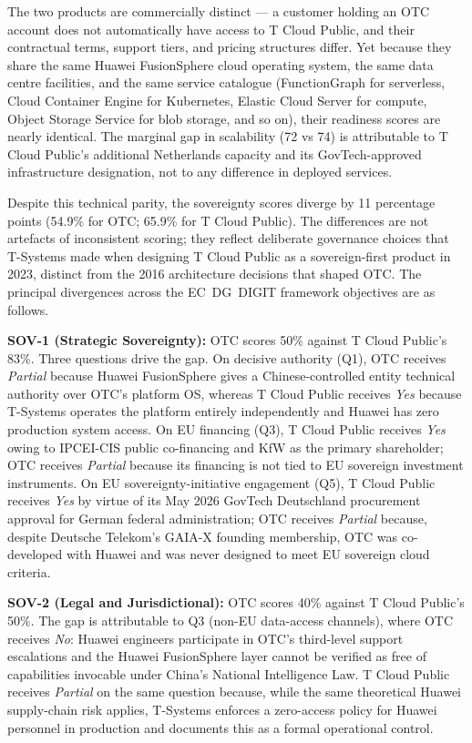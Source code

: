 The two products are commercially distinct — a customer holding an OTC account does not automatically have access to T Cloud Public, and their contractual terms, support tiers, and pricing structures differ. Yet because they share the same Huawei FusionSphere cloud operating system, the same data centre facilities, and the same service catalogue (FunctionGraph for serverless, Cloud Container Engine for Kubernetes, Elastic Cloud Server for compute, Object Storage Service for blob storage, and so on), their readiness scores are nearly identical. The marginal gap in scalability (72 vs 74) is attributable to T Cloud Public's additional Netherlands capacity and its GovTech-approved infrastructure designation, not to any difference in deployed services.

Despite this technical parity, the sovereignty scores diverge by 11 percentage points (54.9\% for OTC; 65.9\% for T Cloud Public). The differences are not artefacts of inconsistent scoring; they reflect deliberate governance choices that T-Systems made when designing T Cloud Public as a sovereign-first product in 2023, distinct from the 2016 architecture decisions that shaped OTC. The principal divergences across the EC~DG~DIGIT framework objectives are as follows.

\textbf{SOV-1 (Strategic Sovereignty):} OTC scores 50\% against T Cloud Public's 83\%. Three questions drive the gap. On decisive authority (Q1), OTC receives \textit{Partial} because Huawei FusionSphere gives a Chinese-controlled entity technical authority over OTC's platform OS, whereas T Cloud Public receives \textit{Yes} because T-Systems operates the platform entirely independently and Huawei has zero production system access. On EU financing (Q3), T Cloud Public receives \textit{Yes} owing to IPCEI-CIS public co-financing and KfW as the primary shareholder; OTC receives \textit{Partial} because its financing is not tied to EU sovereign investment instruments. On EU sovereignty-initiative engagement (Q5), T Cloud Public receives \textit{Yes} by virtue of its May 2026 GovTech Deutschland procurement approval for German federal administration; OTC receives \textit{Partial} because, despite Deutsche Telekom's GAIA-X founding membership, OTC was co-developed with Huawei and was never designed to meet EU sovereign cloud criteria.

\textbf{SOV-2 (Legal and Jurisdictional):} OTC scores 40\% against T Cloud Public's 50\%. The gap is attributable to Q3 (non-EU data-access channels), where OTC receives \textit{No}: Huawei engineers participate in OTC's third-level support escalations and the Huawei FusionSphere layer cannot be verified as free of capabilities invocable under China's National Intelligence Law. T Cloud Public receives \textit{Partial} on the same question because, while the same theoretical Huawei supply-chain risk applies, T-Systems enforces a zero-access policy for Huawei personnel in production and documents this as a formal operational control.

